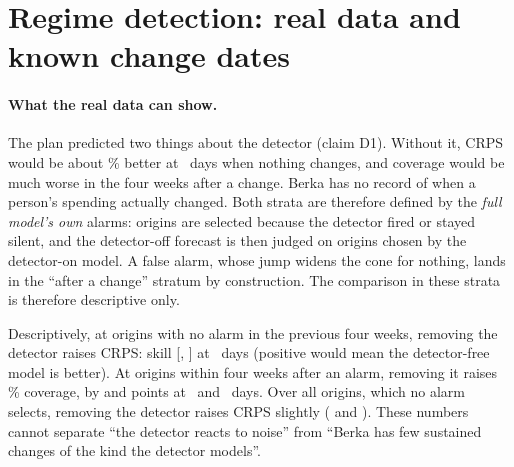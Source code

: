 \section{Regime detection: real data and known change dates}
\label{sec:regime}

\paragraph{What the real data can show.} The plan predicted two things
about the detector (claim D1). Without it, CRPS would be about
\% better at \hC\ days when nothing changes, and
coverage would be much worse in the four weeks after a change. Berka has
no record of when a person's spending actually changed. Both strata are
therefore defined by the \emph{full model's own} alarms: origins are
selected because the detector fired or stayed silent, and the
detector-off forecast is then judged on origins chosen by the detector-on
model. A false alarm, whose jump widens the cone for nothing, lands in the
``after a change'' stratum by construction. The comparison in these
strata is therefore descriptive only.

Descriptively, at origins with no alarm in the previous four weeks,
removing the detector raises CRPS: skill
[,
] at \hC\ days
(positive would mean the detector-free model is better). At origins within
four weeks after an alarm, removing it raises \lC\% coverage, by
 and
points at \hB\ and \hC\ days. Over all origins, which no alarm selects,
removing the detector raises CRPS slightly
( and
). These numbers cannot
separate ``the detector reacts to noise'' from ``Berka has few sustained
changes of the kind the detector models''.

